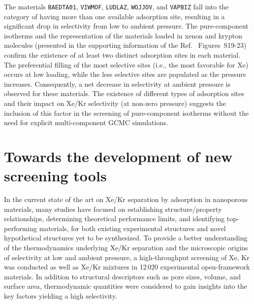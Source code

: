 \documentclass[main.tex]{subfiles}
\begin{document}
The materials \texttt{BAEDTA01}, \texttt{VIWMOF}, \texttt{LUDLAZ}, \texttt{WOJJOV}, and \texttt{VAPBIZ} fall into the category of having more than one available adsorption site, resulting in a significant drop in selectivity from low to ambient pressure. The pure-component isotherms and the representation of the materials loaded in xenon and krypton molecules (presented in the supporting information of the Ref.~\cite{Ren_2021} Figures~S19-23) confirm the existence of at least two distinct adsorption sites in each material. The preferential filling of the most selective sites (i.e., the most favorable for Xe) occurs at low loading, while the less selective sites are populated as the pressure increases. Consequently, a net decrease in selectivity at ambient pressure is observed for these materials. The existence of different types of adsorption sites and their impact on Xe/Kr selectivity (at non-zero pressure) suggests the inclusion of this factor in the screening of pure-component isotherms without the need for explicit multi-component GCMC simulations.

\section{Towards the development of new screening tools}

In the current state of the art on Xe/Kr separation by adsorption in nanoporous materials, many studies have focused on establishing structure/property relationships, determining theoretical performance limits, and identifying top-performing materials, for both existing experimental structures and novel hypothetical structures yet to be synthesized. To provide a better understanding of the thermodynamics underlying Xe/Kr separation and the microscopic origins of selectivity at low and ambient pressure, a high-throughput screening of Xe, Kr was conducted as well as Xe/Kr mixtures in 12\,020 experimental open-framework materials. In addition to structural descriptors such as pore sizes, volume, and surface area, thermodynamic quantities were considered to gain insights into the key factors yielding a high selectivity.
\end{document}
